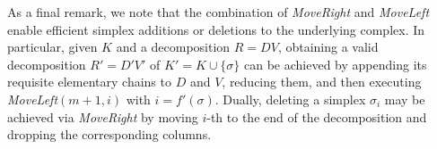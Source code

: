 \documentclass[sn-mathphys]{sn-jnl}
\begin{document}
As a final remark, we note that the combination of \emph{MoveRight} and \emph{MoveLeft} enable efficient simplex additions or deletions to the underlying complex. In particular, given $K$ and a decomposition $R = DV$, obtaining a valid decomposition $R' = D' V'$ of $K' = K \cup \{\sigma\}$ can be achieved by appending its requisite elementary chains to $D$ and $V$, reducing them, and then executing \emph{MoveLeft}$(m+1, i)$ with $i = f'(\sigma)$. Dually, deleting a simplex $\sigma_i$ may be achieved via \emph{MoveRight} by moving $i$-th to the end of the decomposition and dropping the corresponding columns. 

\end{document}
